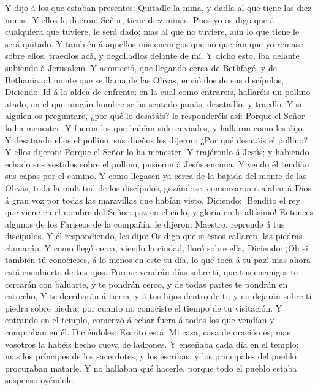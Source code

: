  Y dijo á los que estaban presentes: Quitadle la mina, y
dadla al que tiene las diez minas.  Y ellos le dijeron:
Señor, tiene diez minas.  Pues yo os digo que á cualquiera
que tuviere, le será dado; mas al que no tuviere, aun lo que tiene le
será quitado.  Y también á aquellos mis enemigos que no
querían que yo reinase sobre ellos, traedlos acá, y degolladlos delante
de mí.  Y dicho esto, iba delante subiendo á Jerusalem.
 Y aconteció, que llegando cerca de Bethfagé, y de
Bethania, al monte que se llama de las Olivas, envió dos de sus
discípulos,  Diciendo: Id á la aldea de enfrente; en la
cual como entrareis, hallaréis un pollino atado, en el que ningún hombre
se ha sentado jamás; desatadlo, y traedlo.  Y si alguien os
preguntare, ¿por qué lo desatáis? le responderéis así: Porque el Señor
lo ha menester.  Y fueron los que habían sido enviados, y
hallaron como les dijo.  Y desatando ellos el pollino, sus
dueños les dijeron: ¿Por qué desatáis el pollino?  Y ellos
dijeron: Porque el Señor lo ha menester.  Y trajéronlo á
Jesús; y habiendo echado sus vestidos sobre el pollino, pusieron á Jesús
encima.  Y yendo él tendían sus capas por el camino.
 Y como llegasen ya cerca de la bajada del monte de las
Olivas, toda la multitud de los discípulos, gozándose, comenzaron á
alabar á Dios á gran voz por todas las maravillas que habían visto,
 Diciendo: ¡Bendito el rey que viene en el nombre del
Señor: paz en el cielo, y gloria en lo altísimo!  Entonces
algunos de los Fariseos de la compañía, le dijeron: Maestro, reprende á
tus discípulos.  Y él respondiendo, les dijo: Os digo que
si éstos callaren, las piedras clamarán.  Y como llegó
cerca, viendo la ciudad, lloró sobre ella,  Diciendo: ¡Oh
si también tú conocieses, á lo menos en este tu día, lo que toca á tu
paz! mas ahora está encubierto de tus ojos.  Porque vendrán
días sobre ti, que tus enemigos te cercarán con baluarte, y te pondrán
cerco, y de todas partes te pondrán en estrecho,  Y te
derribarán á tierra, y á tus hijos dentro de ti; y no dejarán sobre ti
piedra sobre piedra; por cuanto no conociste el tiempo de tu visitación.
 Y entrando en el templo, comenzó á echar fuera á todos los
que vendían y compraban en él.  Diciéndoles: Escrito está:
Mi casa, casa de oración es; mas vosotros la habéis hecho cueva de
ladrones.  Y enseñaba cada día en el templo; mas los
príncipes de los sacerdotes, y los escribas, y los principales del
pueblo procuraban matarle.  Y no hallaban qué hacerle,
porque todo el pueblo estaba suspenso oyéndole.

